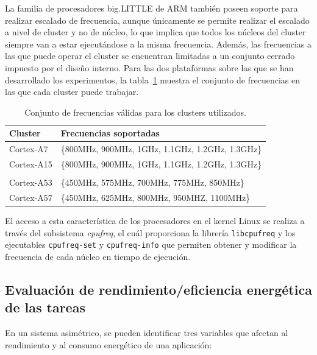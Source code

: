 La familia de procesadores big.LITTLE de ARM también poseen soporte para
realizar escalado de frecuencia, aunque únicamente se permite realizar el
escalado a nivel de cluster y no de núcleo, lo que implica que todos los
núcleos del cluster siempre van a estar ejecutándose a la misma
frecuencia. Además, las frecuencias a las que puede operar el cluster se
encuentran limitadas a un conjunto cerrado impuesto por el diseño
interno. Para las dos plataformas sobre las que se han desarrollado los
experimentos, la tabla~\ref{tab:cjto-freqs} muestra el conjunto de
frecuencias en las que cada cluster puede trabajar.

\begin{table}
  \centering
  {
    \ca{8pt}
    \begin{tabular}{ll}
      Cluster & Frecuencias soportadas \\\hline
      Cortex-A7    & \{800MHz, 900MHz, 1GHz, 1.1GHz, 1.2GHz, 1.3GHz\}\\
      Cortex-A15& \{800MHz, 900MHz, 1GHz, 1.1GHz, 1.2GHz,
                  1.3GHz\}\\\\
      Cortex-A53& \{450MHz, 575MHz, 700MHz, 775MHz,
                  850MHz\}\\
      Cortex-A57& \{450MHz, 625MHz, 800MHz, 950MHZ, 1100MHz\}\\\bottomrule
    \end{tabular}
  }
    \caption{Conjunto de frecuencias válidas para los clusters utilizados.}
    \label{tab:cjto-freqs}
\end{table}

El acceso a esta característica de los procesadores en el kernel Linux se
realiza a través del subsistema \emph{cpufreq}, el cuál proporciona la
librería \texttt{libcpufreq} y los ejecutables \texttt{cpufreq-set} y
\texttt{cpufreq-info} que permiten obtener y modificar la frecuencia de
cada núcleo en tiempo de ejecución.

\subsection{Evaluación de rendimiento/eficiencia energética de las tareas}

En un sistema asimétrico, se pueden identificar tres variables que afectan
al rendimiento y al consumo energético de una aplicación: 

